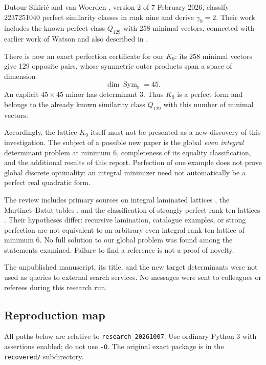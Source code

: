 \documentclass[11pt,a4paper]{article}
\theoremstyle{remark}\newtheorem{remark}[theorem]{Remark}
\newcommand{\file}[1]{{\small\nolinkurl{#1}}}
\begin{document}
Dutour Sikirić and van Woerden \cite{dw}, version 2 of 7 February 2026, classify 2237251040 perfect similarity classes in rank nine and derive $\gamma_9=2$. Their work includes the known perfect class $Q_{129}$ with 258 minimal vectors, connected with earlier work of Watson and also described in \cite{vwthesis}.

There is now an exact perfection certificate for our $K_9$: its 258 minimal vectors give 129 opposite pairs, whose symmetric outer products span a space of dimension
\[
\dim\operatorname{Sym}_9=45.
\]
An explicit $45\times45$ minor has determinant 3. Thus $K_9$ is a perfect form and belongs to the already known similarity class $Q_{129}$ with this number of minimal vectors.

Accordingly, the lattice $K_9$ itself must not be presented as a new discovery of this investigation. The subject of a possible new paper is the global \emph{even integral} determinant problem at minimum 6, completeness of its equality classification, and the additional results of this report. Perfection of one example does not prove global discrete optimality: an integral minimizer need not automatically be a perfect real quadratic form.

The review includes primary sources on integral laminated lattices \cite{cs,pp}, the Martinet--Batut tables \cite{martinet}, and the classification of strongly perfect rank-ten lattices \cite{nv}. Their hypotheses differ: recursive lamination, catalogue examples, or strong perfection are not equivalent to an arbitrary even integral rank-ten lattice of minimum 6. No full solution to our global problem was found among the statements examined. Failure to find a reference is not a proof of novelty.

The unpublished manuscript, its title, and the new target determinants were not used as queries to external search services. No messages were sent to colleagues or referees during this research run.

\Needspace{12cm}
\subsection{Reproduction map}

All paths below are relative to \file{research_20261007}. Use ordinary Python 3 with assertions enabled; do not use \texttt{-O}. The original exact package is in the \file{recovered/} subdirectory.
\end{document}
